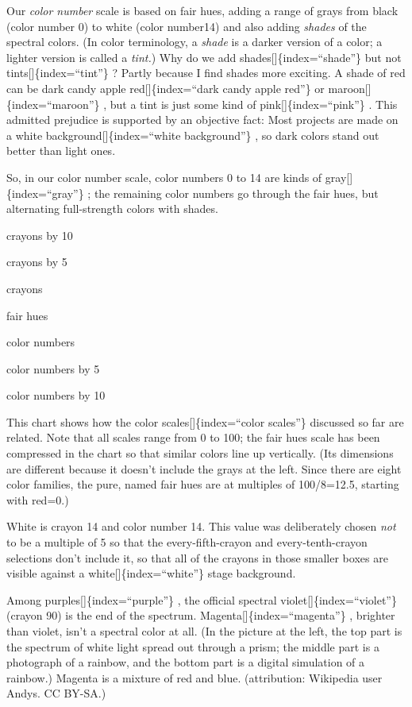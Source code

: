 \documentclass[
  letterpaper,
]{book}
\begin{document}
Our \emph{color number} scale is based on fair hues, adding a range of
grays from black (color number 0) to white (color number14) and also
adding \emph{shades} of the spectral colors. (In color terminology, a
\emph{shade} is a darker version of a color; a lighter version is called
a \emph{tint.}) Why do we add shades{[}{]}\{index=``shade''\} but not
tints{[}{]}\{index=``tint''\} ? Partly because I find shades more
exciting. A shade of red can be dark candy apple red{[}{]}\{index=``dark
candy apple red''\} or maroon{[}{]}\{index=``maroon''\} , but a tint is
just some kind of pink{[}{]}\{index=``pink''\} . This admitted prejudice
is supported by an objective fact: Most projects are made on a white
background{[}{]}\{index=``white background''\} , so dark colors stand
out better than light ones.

So, in our color number scale, color numbers 0 to 14 are kinds of
gray{[}{]}\{index=``gray''\} ; the remaining color numbers go through
the fair hues, but alternating full-strength colors with shades.

crayons by 10

crayons by 5

crayons

fair hues

color numbers

color numbers by 5

color numbers by 10

This chart shows how the color scales{[}{]}\{index=``color scales''\}
discussed so far are related. Note that all scales range from 0 to 100;
the fair hues scale has been compressed in the chart so that similar
colors line up vertically. (Its dimensions are different because it
doesn't include the grays at the left. Since there are eight color
families, the pure, named fair hues are at multiples of 100/8=12.5,
starting with red=0.)

White is crayon 14 and color number 14. This value was deliberately
chosen \emph{not} to be a multiple of 5 so that the every-fifth-crayon
and every-tenth-crayon selections don't include it, so that all of the
crayons in those smaller boxes are visible against a
white{[}{]}\{index=``white''\} stage background.

Among purples{[}{]}\{index=``purple''\} , the official spectral
violet{[}{]}\{index=``violet''\} (crayon 90) is the end of the spectrum.
Magenta{[}{]}\{index=``magenta''\} , brighter than violet, isn't a
spectral color at all. \label{rainbow}{}(In the picture
at the left, the top part is the spectrum of white light spread out
through a prism; the middle part is a photograph of a rainbow, and the
bottom part is a digital simulation of a rainbow.) Magenta is a mixture
of red and blue. (attribution: Wikipedia user Andys. CC BY-SA.)
\end{document}
